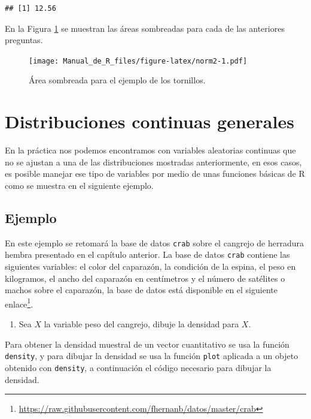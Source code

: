\documentclass[10pt,]{krantz}
\providecommand{\tightlist}{%
  \setlength{\itemsep}{0pt}\setlength{\parskip}{0pt}}
\renewcommand{\href}[2]{#2\footnote{\url{#1}}}
\begin{document}
\begin{verbatim}
## [1] 12.56
\end{verbatim}

En la Figura \ref{fig:norm2} se muestran las áreas sombreadas para cada
de las anteriores preguntas.

\begin{figure}
\centering
\texttt{[image: Manual\_de\_R\_files/figure-latex/norm2-1.pdf]}
\caption{\label{fig:norm2}Área sombreada para el ejemplo de los tornillos.}
\end{figure}

\section{Distribuciones continuas
generales}\label{distribuciones-continuas-generales}

En la práctica nos podemos encontramos con variables aleatorias
continuas que no se ajustan a una de las distribuciones mostradas
anteriormente, en esos casos, es posible manejar ese tipo de variables
por medio de unas funciones básicas de R como se muestra en el siguiente
ejemplo.

\subsection*{Ejemplo}\label{ejemplo-48}


En este ejemplo se retomará la base de datos \texttt{crab} sobre el
cangrejo de herradura hembra presentado en el capítulo anterior. La base
de datos \texttt{crab} contiene las siguientes variables: el color del
caparazón, la condición de la espina, el peso en kilogramos, el ancho
del caparazón en centímetros y el número de satélites o machos sobre el
caparazón, la base de datos está disponible en el siguiente
\href{https://raw.githubusercontent.com/fhernanb/datos/master/crab}{enlace}.

\begin{enumerate}
\def\labelenumi{\arabic{enumi})}
\tightlist
\item
  Sea \(X\) la variable peso del cangrejo, dibuje la densidad para
  \(X\).
\end{enumerate}

Para obtener la densidad muestral de un vector cuantitativo se usa la
función \texttt{density}, y para dibujar la densidad se usa la función
\texttt{plot} aplicada a un objeto obtenido con \texttt{density}, a
continuación el código necesario para dibujar la densidad.
\end{document}
